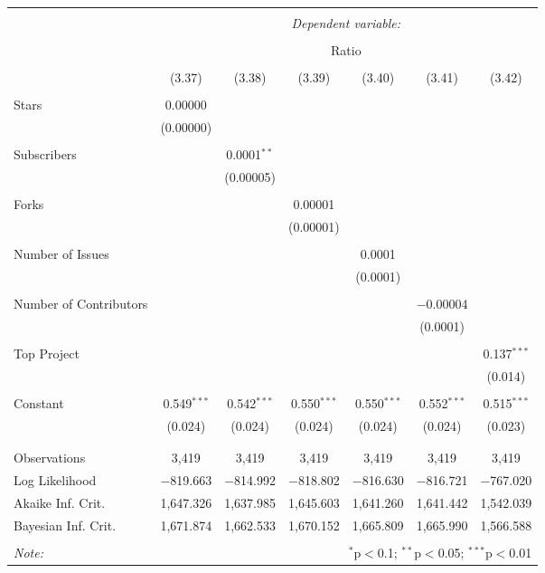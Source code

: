 
\begin{tabular}{@{\extracolsep{5pt}}lcccccc}
\\[-1.8ex]\hline
\hline \\[-1.8ex]
 & \multicolumn{6}{c}{\textit{Dependent variable:}} \\
\cline{2-7}
\\[-1.8ex] & \multicolumn{6}{c}{Ratio} \\
\\[-1.8ex] & (3.37) & (3.38) & (3.39) & (3.40) & (3.41) & (3.42)\\
\hline \\[-1.8ex]
 Stars & 0.00000 &  &  &  &  &  \\
  & (0.00000) &  &  &  &  &  \\
  & & & & & & \\
 Subscribers &  & 0.0001$^{**}$ &  &  &  &  \\
  &  & (0.00005) &  &  &  &  \\
  & & & & & & \\
 Forks &  &  & 0.00001 &  &  &  \\
  &  &  & (0.00001) &  &  &  \\
  & & & & & & \\
 Number of Issues &  &  &  & 0.0001 &  &  \\
  &  &  &  & (0.0001) &  &  \\
  & & & & & & \\
 Number of Contributors &  &  &  &  & $-$0.00004 &  \\
  &  &  &  &  & (0.0001) &  \\
  & & & & & & \\
 Top Project &  &  &  &  &  & 0.137$^{***}$ \\
  &  &  &  &  &  & (0.014) \\
  & & & & & & \\
 Constant & 0.549$^{***}$ & 0.542$^{***}$ & 0.550$^{***}$ & 0.550$^{***}$ & 0.552$^{***}$ & 0.515$^{***}$ \\
  & (0.024) & (0.024) & (0.024) & (0.024) & (0.024) & (0.023) \\
  & & & & & & \\
\hline \\[-1.8ex]
Observations & 3,419 & 3,419 & 3,419 & 3,419 & 3,419 & 3,419 \\
Log Likelihood & $-$819.663 & $-$814.992 & $-$818.802 & $-$816.630 & $-$816.721 & $-$767.020 \\
Akaike Inf. Crit. & 1,647.326 & 1,637.985 & 1,645.603 & 1,641.260 & 1,641.442 & 1,542.039 \\
Bayesian Inf. Crit. & 1,671.874 & 1,662.533 & 1,670.152 & 1,665.809 & 1,665.990 & 1,566.588 \\
\hline
\hline \\[-1.8ex]
\textit{Note:}  & \multicolumn{6}{r}{$^{*}$p$<$0.1; $^{**}$p$<$0.05; $^{***}$p$<$0.01} \\
\end{tabular}
